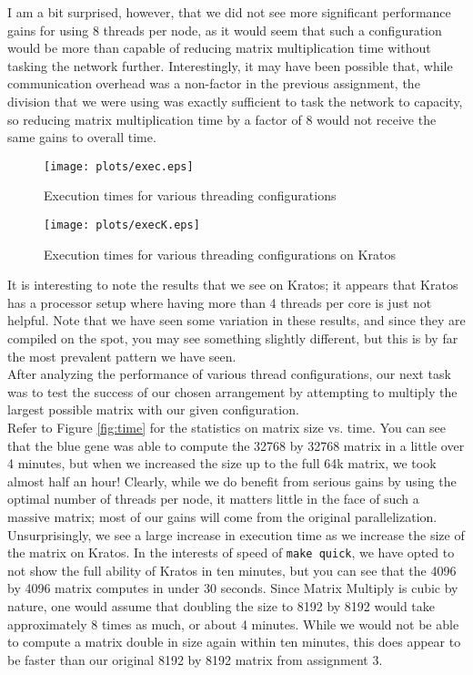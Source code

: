 \documentclass[twocolumn]{article}
\begin{document}
I am a bit surprised, however, that we did not see 
more significant performance gains for using 8 threads per node, as it would seem 
that such a configuration would be more than capable of reducing matrix 
multiplication time without tasking the network further. Interestingly, it may
have been possible that, while communication overhead was a non-factor in the 
previous assignment, the division that we were using was exactly sufficient to
task the network to capacity, so reducing matrix multiplication time by a factor
of 8 would not receive the same gains to overall time. \\

\begin{figure}
  \centering
  \texttt{[image: plots/exec.eps]}
  \caption{Execution times for various threading configurations} \label{fig:exec}
\end{figure}

\begin{figure}
  \centering
  \texttt{[image: plots/execK.eps]}
  \caption{Execution times for various threading configurations on Kratos} 
\end{figure}

It is interesting to note the results that we see on Kratos; it appears that Kratos
has a processor setup where having more than 4 threads per
core is just not helpful. Note that we have seen some variation in these results,
and since they are compiled on the spot, you may see something slightly different,
but this is by far the most prevalent pattern we have seen.\\

After analyzing the performance of various thread configurations, our next task
was to test the success of our chosen arrangement by attempting to multiply the
largest possible matrix with our given configuration. \\

Refer to Figure \ref{fig:time} for the statistics on matrix size vs. time. You can
see that the blue gene was able to compute the 32768 by 32768 matrix in a little 
over 4 minutes, but when we increased the size up to the full 64k matrix, we took
almost half an hour! Clearly, while we do benefit from serious gains by using the
optimal number of threads per node, it matters little in the face of such a massive
matrix; most of our gains will come from the original parallelization. \\

Unsurprisingly, we see a large increase in execution time as we increase the size
of the matrix on Kratos. In the interests of speed of \texttt{make quick}, we have
opted to not show the full ability of Kratos in ten minutes, but you can see that 
the 4096 by 4096 matrix computes in under 30 seconds. Since Matrix Multiply is 
cubic by nature, one would assume that doubling the size to 8192 by 8192 would 
take approximately 8 times as much, or about 4 minutes. While we would not be able
to compute a matrix double in size again within ten minutes, this does appear to 
be faster than our original 8192 by 8192 matrix from assignment 3.
\end{document}
